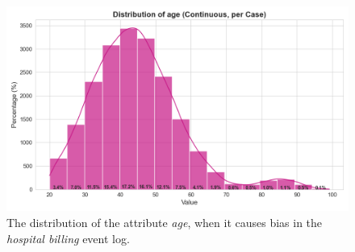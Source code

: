 \begin{figure}[h!]
    \centering
    \includegraphics[width=\imagewidth]{gfx/hb_age.png}
    \caption{The distribution of the attribute \textit{age},
    when it causes bias in the \textit{hospital billing} event log.}
    \label{fig:hb_age}
\end{figure}


